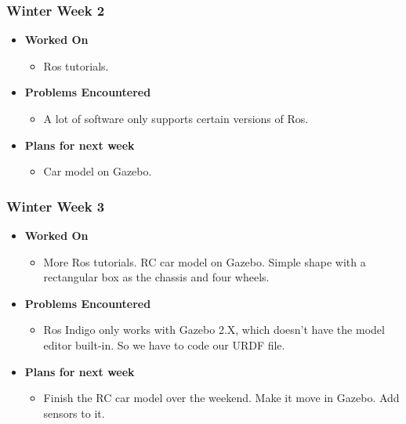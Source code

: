 \documentclass[compsoc,draftclsnofoot,onecolumn,10pt]{IEEEtran}
\begin{document}
\subsubsection{Winter Week 2}
\begin{itemize}
    \item {\textbf{Worked On}}
    \begin{itemize}
      \item Ros tutorials.
    \end{itemize}

    \item {\textbf{Problems Encountered}}
    \begin{itemize}
      \item A lot of software only supports certain versions of Ros.
    \end{itemize}

    \item{\textbf{Plans for next week}}
    \begin{itemize}
      \item Car model on Gazebo.
    \end{itemize}

\end{itemize}

\subsubsection{Winter Week 3}
\begin{itemize}
    \item {\textbf{Worked On}}
    \begin{itemize}
      \item More Ros tutorials. RC car model on Gazebo. Simple shape with a
      rectangular box as the chassis and four wheels.
    \end{itemize}

    \item {\textbf{Problems Encountered}}
    \begin{itemize}
      \item Ros Indigo only works with Gazebo 2.X, which doesn't have the
      model editor built-in. So we have to code our URDF file.
    \end{itemize}

    \item{\textbf{Plans for next week}}
    \begin{itemize}
      \item Finish the RC car model over the weekend. Make it move in
      Gazebo. Add sensors to it.
    \end{itemize}

\end{itemize}
\end{document}
